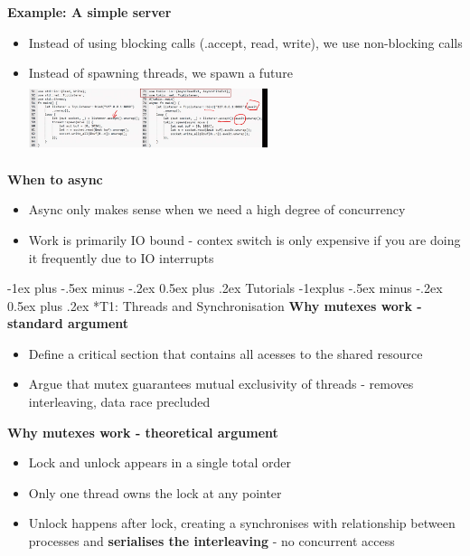\documentclass[10pt, landscape]{article}
\makeatletter
\renewcommand{\section}{\@startsection{section}{1}{0mm}%
                                {-1ex plus -.5ex minus -.2ex}%
                                {0.5ex plus .2ex}%
                                {\normalfont\large\bfseries}}
\renewcommand{\subsection}{\@startsection{subsection}{2}{0mm}%
                                {-1explus -.5ex minus -.2ex}%
                                {0.5ex plus .2ex}%
                                {\normalfont\normalsize\bfseries}}
\makeatother
\begin{document}
\begin{multicols}{4}
\textbf{Example: A simple server} \\
\begin{itemize}
    \item Instead of using blocking calls (.accept, read, write), we use non-blocking calls
    \item Instead of spawning threads, we spawn a future 
    \includegraphics*[width=7cm, height=2.1cm]{simpleserver.png}
\end{itemize}

\textbf{When to async} \\
\begin{itemize}
    \item Async only makes sense when we need a high degree of concurrency 
    \item Work is primarily IO bound - contex switch is only expensive if you are doing it frequently due to IO interrupts
\end{itemize}
\pagebreak
\section{Tutorials}
\subsection*{T1: Threads and Synchronisation}
\textbf{Why mutexes work - standard argument}\\ 
\begin{itemize}
    \item Define a critical section that contains all acesses to the shared resource 
    \item Argue that mutex guarantees mutual exclusivity of threads - removes interleaving, data race precluded
\end{itemize}

\textbf{Why mutexes work - theoretical argument}\\
\begin{itemize}
    \item Lock and unlock appears in a single total order
    \item Only one thread owns the lock at any pointer
    \item Unlock happens after lock, creating a synchronises with relationship between processes and \textbf{serialises the interleaving} - no concurrent access
\end{itemize}



\end{multicols}
\end{document}
